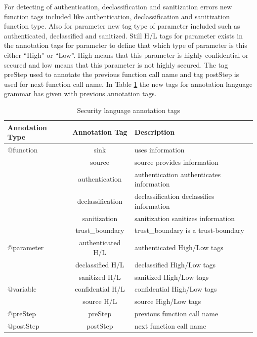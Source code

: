For detecting of authentication, declassification and sanitization errors new function tags included like authentication, declassification and sanitization function type. Also for parameter new tag type of parameter included such as authenticated, declassified and sanitized. Still H/L tags for parameter exists in the annotation tags for parameter to define that which type of parameter is this either \enquote{High} or \enquote{Low}. High means that this parameter is highly confidential or secured and low means that this parameter is not highly secured. The tag preStep used to annotate the previous function call name and tag postStep is used for next function call name. In Table \ref{table:Security_language_annotation_tags} the new tags for annotation language grammar has given with previous annotation tags. 

\begin{table}
	\centering
\begin{tabular}{|l|c|p{5cm}|}
	\hline
	Annotation Type   & Annotation Tag & Description  \\
	\hline

	@function         & sink  		   & uses information \\
	                  & source         & source provides information	\\
	                  & authentication & authentication authenticates information	\\
	                  & declassification& declassification declassifies information	\\
	                  & sanitization   & sanitization sanitizes information	\\
	                  & trust\_boundary& trust\_boundary is a trust-boundary\\ \hline

	@parameter        & authenticated H/L& authenticated High/Low tags\\
					  & declassified H/L  & declassified High/Low tags    \\
				      & sanitized H/L     & sanitized High/Low tags    \\ \hline
	@variable         & confidential H/L & confidential High/Low tags\\
					  & source H/L & source High/Low tags   \\
	\hline
	
	@preStep         & preStep  & previous function call name\\ 	\hline
	@postStep        & postStep  & next function call name\\ 	\hline

	
\end{tabular}
\caption{Security language annotation tags}
\label{table:Security_language_annotation_tags}
\end{table}

